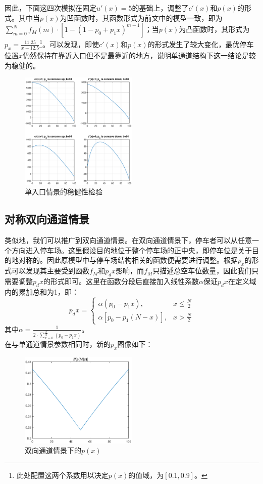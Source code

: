 \documentclass{thuemp}
\begin{document}
\par 因此，下面这四次模拟在固定$u'(x)=5$的基础上，调整了$c'(x)$和$p(x)$的形式。其中当$p(x)$为凹函数时，其函数形式为前文中的模型一致，即为$\sum_{m=0}^{N}f_M(m)\cdot [1-(1-p_0+p_1x)^{m-1}]$；当$p(x)$为凸函数时，其形式为$p_x=\frac{11.25}{x+12.5}$\footnote{此处配置这两个系数用以决定$p(x)$的值域，为$[0.1,0.9]$。}。可以发现，即使$c'(x)$和$p(x)$的形式发生了较大变化，最优停车位置$x$仍然保持在靠近入口但不是最靠近的地方，说明单通道结构下这一结论是较为稳健的。

\begin{figure}[H]
    \centering
    \includegraphics[width=0.5\textwidth]{single_entrance_robust.eps}
    \caption{单入口情景的稳健性检验}    
\end{figure}

\subsection{对称双向通道情景}

\par 类似地，我们可以推广到双向通道情景。在双向通道情景下，停车者可以从任意一个方向进入停车场。这里假设目的地位于整个停车场的正中央，即停车位是关于目的地对称的。因此原模型中与停车场结构相关的函数便需要进行调整。根据$p_x$的形式可以发现其主要受到函数$f_M$和$p_dx$影响，而$f_M$只描述总空车位数量，因此我们只需要调整$p_dx$的形式即可。这里在函数分段后直接加入线性系数$\alpha$保证$p_dx$在定义域内的累加总和为1，即：
$$p_dx = \begin{cases}
    \alpha(p_0-p_1x), & x\leq \frac{N}{2}\\
    \alpha[p_0-p_1(N-x)], & x>\frac{N}{2}
\end{cases}$$
其中$\alpha = \frac{1}{2\cdot\sum_{x=0}^{\frac{N}{2}}(p_0-p_1x)}$。\\
在与单通道情景参数相同时，新的$p_x$图像如下：

\begin{figure}[H]
    \centering
    \includegraphics[width=0.5\textwidth]{double_entrance_p_x.eps}
    \caption{双向通道情景下的$p(x)$}
\end{figure}
\end{document}

